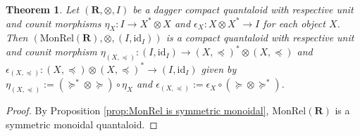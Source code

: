 \documentclass[12pt]{tac}
\newtheorem{theorem}{Theorem}[section]
\theoremstyle{definition}
\theoremstyle{remark}
\newcommand{\qo}{{\boldsymbol{\preccurlyeq}}}
\newcommand{\qop}{{\boldsymbol{\succcurlyeq}}}
\newcommand{\<}{\langle}
\renewcommand{\>}{\rangle}
\renewcommand{\:}{\colon}
\newcommand{\id}{\mathrm{id}}
\begin{document}
\begin{theorem}
    Let $(\mathbf R,\otimes,I)$ be a dagger compact quantaloid with respective unit and counit morphisms $\eta_X:I\to X^*\otimes X$ and $\epsilon_X:X\otimes X^*\to I$ for each object $X$. Then $(\mathrm{MonRel}(\mathbf R),\otimes,(I,\id_I))$ is a compact quantaloid with respective unit and counit morphism $\eta_{(X,\qo)}:(I,\id_I)\to (X,\qo)^*\otimes(X,\qo)$ and $\epsilon_{(X,\qo)}:(X,\qo)\otimes(X,\qo)^*\to(I,\id_I)$ given by $\eta_{(X,\qo)}:=(\qop^*\otimes\qop)\circ\eta_X$ and $\epsilon_{(X,\qo)}:=\epsilon_X\circ(\qop\otimes\qop^*)$.
\end{theorem}

\begin{proof}
By Proposition \ref{prop:MonRel is symmetric monoidal}, $\mathrm{MonRel}(\mathbf R)$ is a symmetric monoidal quantaloid. 


\end{proof}
\end{document}
